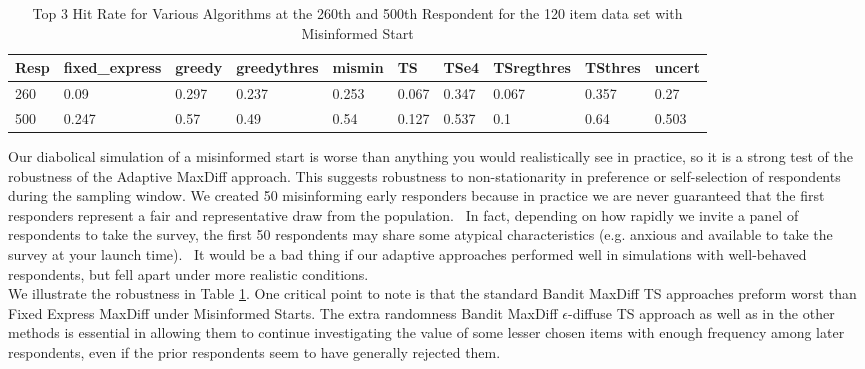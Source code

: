 \documentclass[nonblindrev]{informs3}
\begin{document}
\begin{table}
\begin{tabular}{llllllllll}
\hline   Resp &  fixed\_express &  greedy &  greedythres &  mismin &    TS &  TSe4 &  TSregthres &  TSthres &  uncert  \\ \hline    260 &   0.09 &   0.297 &  0.237 &   0.253 & 0.067 & 0.347 &  0.067 &    0.357 &   0.27 \\  500 &  0.247 &   0.57 &  0.49 &   	0.54 & 0.127 & 0.537 &       0.1 &    0.64 &   0.503  \end{tabular}
\begin{center}
\caption{Top 3 Hit Rate for Various Algorithms at the 260th and 500th Respondent for the 120 item data set with Misinformed Start}
\label{table:120mis}
\end{center}
\end{table}

Our diabolical simulation of a misinformed start is worse than anything you would realistically see in practice, so it is a strong test of the robustness of the Adaptive MaxDiff approach. This suggests robustness to non-stationarity in preference or self-selection of respondents during the sampling window. We created 50 misinforming early responders because in practice we are never guaranteed that the first responders represent a fair and representative draw from the population.  In fact, depending on how rapidly we invite a panel of respondents to take the survey, the first 50 respondents may share some atypical characteristics (e.g. anxious and available to take the survey at your launch time).  It would be a bad thing if our adaptive approaches performed well in simulations with well-behaved respondents, but fell apart under more realistic conditions. \\

We illustrate the robustness in Table \ref{table:120mis}. One critical point to note is that the standard Bandit MaxDiff TS approaches preform worst than Fixed Express MaxDiff under Misinformed Starts.  The extra randomness Bandit MaxDiff $\epsilon$-diffuse TS approach as well as in the other methods  is essential in allowing them to continue investigating the value of some lesser chosen items with enough frequency among later respondents, even if the prior respondents seem to have generally rejected them.
\end{document}
